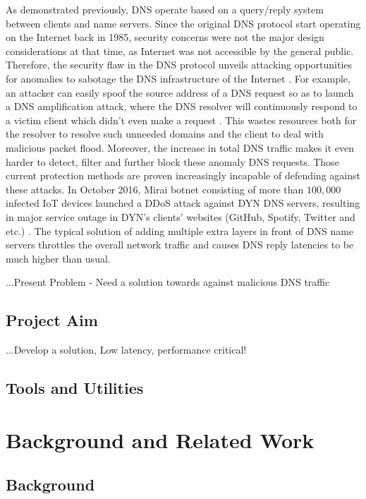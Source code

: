 \documentclass[a4paper]{report}
\begin{document}
As demonstrated previously, DNS operate based on a query/reply system between clients and name servers. Since the original DNS protocol start operating on the Internet back in 1985, security concerns were not the major design considerations at that time, as Internet was not accessible by the general public. Therefore, the security flaw in the DNS protocol unveils attacking opportunities for anomalies to sabotage the DNS infrastructure of the Internet \cite{antonakakis2010centralized}. For example, an attacker can easily spoof the source address of a DNS request so as to launch a DNS amplification attack, where the DNS resolver will continuously respond to a victim client which didn't even make a request \cite{kambourakis2007detecting}. This wastes resources both for the resolver to resolve such unneeded domains and the client to deal with malicious packet flood. Moreover, the increase in total DNS traffic makes it even harder to detect, filter and further block these anomaly DNS requests. Those current protection methods are proven increasingly incapable of defending against these attacks. In October 2016, Mirai botnet consisting of more than $100,000$ infected IoT devices launched a DDoS attack against DYN DNS servers, resulting in major service outage in DYN's clients' websites (GitHub, Spotify, Twitter and etc.) \cite{bisson-2016}. The typical solution of adding multiple extra layers in front of DNS name servers throttles the overall network traffic and causes DNS reply latencies to be much higher than usual\cite{Mahjabin-2020}.

...Present Problem - Need a solution towards against malicious DNS traffic

\section{Project Aim}

...Develop a solution, Low latency, performance critical!

\section{Tools and Utilities}

\chapter{Background and Related Work}

\section{Background}
\end{document}
